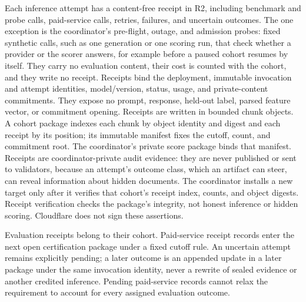 Each inference attempt has a content-free receipt in R2, including benchmark
and probe calls, paid-service calls, retries, failures, and uncertain outcomes.
The one exception is the coordinator's pre-flight, outage, and admission
probes: fixed synthetic calls, such as one generation or one scoring run, that
check whether a provider or the scorer answers, for example before a paused
cohort resumes by itself. They carry no evaluation content, their cost is
counted with the cohort, and they write no receipt. Receipts bind
the deployment, immutable invocation and attempt identities, model/version,
status, usage, and private-content commitments. They expose no prompt, response,
held-out label, parsed feature vector, or commitment opening. Receipts are
written in bounded chunk objects. A cohort package indexes each chunk by object
identity and digest and each receipt by its position; its immutable manifest
fixes the cutoff, count, and commitment root. The coordinator's private score
package binds that manifest. Receipts are coordinator-private audit evidence:
they are never published or sent to validators, because an attempt's outcome
class, which an artifact can steer, can reveal information about hidden
documents. The coordinator installs a new target only after it verifies that
cohort's receipt index, counts, and object digests. Receipt verification checks
the package's integrity, not honest inference or hidden scoring. Cloudflare does
not sign these assertions.

Evaluation receipts belong to their cohort. Paid-service receipt records enter
the next open certification package under a fixed cutoff rule. An uncertain
attempt remains explicitly pending; a later outcome is an appended update in a
later package under the same invocation identity, never a rewrite of sealed
evidence or another credited inference. Pending paid-service records cannot
relax the requirement to account for every assigned evaluation outcome.

